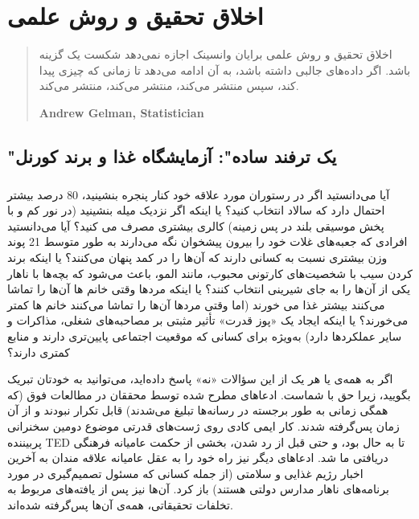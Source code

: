 

\chapter{اخلاق تحقیق و روش علمی}
\label{ch:اخلاق تحقیق و روش علمی}

\begin{quote}
    اخلاق تحقیق و روش علمی برایان وانسینک اجازه نمی‌دهد شکست یک گزینه باشد.
    اگر داده‌های جالبی داشته باشد، به آن ادامه می‌دهد تا زمانی که چیزی پیدا کند، سپس منتشر می‌کند، منتشر می‌کند، منتشر می‌کند.
    \begin{flushleft}
        \textenglish{\textbf{Andrew Gelman, Statistician}}
    \end{flushleft}
\end{quote}


\section*{"یک ترفند ساده": آزمایشگاه غذا و برند کورنل}
\label{sec:"یک ترفند ساده": آزمایشگاه غذا و برند کورنل}

\paragraph{}
آیا می‌دانستید اگر در رستوران مورد علاقه خود کنار پنجره بنشینید، 80 درصد بیشتر احتمال دارد که سالاد انتخاب کنید؟ یا اینکه اگر نزدیک میله بنشینید (در نور کم و با پخش موسیقی بلند در پس زمینه) کالری بیشتری مصرف می کنید؟ آیا می‌دانستید افرادی که جعبه‌های غلات خود را بیرون پیشخوان نگه می‌دارند به طور متوسط 21 پوند وزن بیشتری نسبت به کسانی دارند که آن‌ها را در کمد پنهان می‌کنند؟ یا اینکه برند کردن سیب با شخصیت‌های کارتونی محبوب، مانند المو، باعث می‌شود که بچه‌ها با ناهار یکی از آن‌ها را به جای شیرینی انتخاب کنند؟ یا اینکه مردها وقتی خانم ها آن‌ها را تماشا می‌کنند بیشتر غذا می خورند (اما وقتی مردها آن‌ها را تماشا می‌کنند خانم ها کمتر می‌خورند؟ یا اینکه ایجاد یک «پوز قدرت» تأثیر مثبتی بر مصاحبه‌های شغلی، مذاکرات و سایر عملکردها دارد) به‌ویژه برای کسانی که موقعیت اجتماعی پایین‌تری دارند و منابع کمتری دارند؟

اگر به همه‌ی یا هر یک از این سؤالات «نه» پاسخ داده‌اید، می‌توانید به خودتان تبریک بگویید، زیرا حق با شماست.
ادعاهای مطرح شده توسط محققان در مطالعات فوق (که همگی زمانی به طور برجسته در رسانه‌ها تبلیغ می‌شدند) قابل تکرار نبودند و از آن زمان پس‌گرفته شدند.
کار ایمی کادی روی ژست‌های قدرتی موضوع دومین سخنرانی پربیننده TED تا به حال بود، و حتی قبل از رد شدن، بخشی از حکمت عامیانه فرهنگی دریافتی ما شد.
ادعاهای دیگر نیز راه خود را به عقل عامیانه علاقه مندان به آخرین اخبار رژیم غذایی و سلامتی (از جمله کسانی که مسئول تصمیم‌گیری در مورد برنامه‌های ناهار مدارس دولتی هستند) باز کرد.
آن‌ها نیز پس از یافته‌های مربوط به تخلفات تحقیقاتی، همه‌ی آن‌ها پس‌گرفته شده‌اند.

